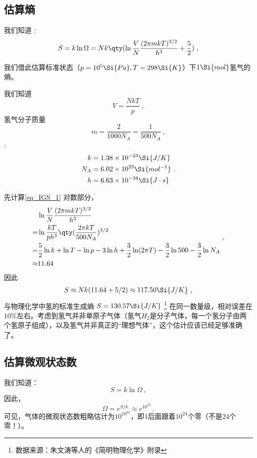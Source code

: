 

\subsection{估算熵}
我们知道 :
\begin{equation}\label{eq_IGS_1}
S = k\ln \Omega  = Nk \qty(\ln \frac{V}{N} \frac{(2\pi mkT)^{3/2}}{h^3} + \frac52)~,
\end{equation}

我们借此估算标准状态（$p=10^5 \Si{Pa}, T=298\Si{K}$）下$1 \Si{mol}$氢气的熵。

我们知道 
$$V=\frac{NkT}{p}~,$$
氢气分子质量 
$$m = \frac{2}{1000 N_A} = \frac{1}{500 N_A}~,$$
 : 
$$
\begin{aligned}
k &= 1.38 \times 10^{-23}\Si{J/K}\\
N_A &= 6.02 \times 10^{23} \Si{mol^{-1}}\\
h &= 6.63\times10^{-34} \Si{J\cdot s}
\end{aligned}
~.$$

先计算\autoref{eq_IGS_1} 对数部分，
$$
\begin{aligned}
 & \ln \frac{V}{N} \frac{(2\pi mkT)^{3/2}}{h^3} \\
 = & \ln \frac{kT}{p h^3} \qty(\frac{2\pi kT}{500 N_A})^{3/2}\\
 = & \frac{5}{2} \ln k + \ln T - \ln p - 3 \ln h + \frac{3}{2} \ln (2 \pi T) - \frac{3}{2} \ln 500 - \frac{3}{2} \ln N_A \\
 \approx & 11.64\\
\end{aligned}~,
$$
因此
$$
\begin{aligned}
S \approx Nk (11.64+5/2) \approx 117.50 \Si{J/K}
\end{aligned}~,
$$
与物理化学中氢的标准生成熵 $S = 130.57 \Si{J/K}$ \footnote{数据来源：朱文涛等人的《简明物理化学》附录} 在同一数量级，相对误差在$10\%$左右。考虑到氢气并非单原子气体（氢气$H_2$是分子气体，每一个氢分子由两个氢原子组成），以及氢气并非真正的“理想气体”，这个估计应该已经足够准确了。

\subsection{估算微观状态数}
我们知道：
\begin{equation}
S = k \ln \Omega~,
\end{equation}
因此，
$$
\Omega = e^{S/k}~ \approx e^{10^{25}} ~.
$$
可见，气体的微观状态数粗略估计为$10^{10^{24}}$，即$1$后面跟着$10^{24}$个零（不是$24$个零！）。


